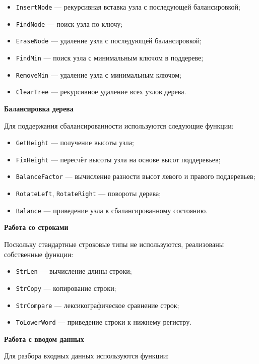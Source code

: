\documentclass[12pt]{article}
\begin{document}
\begin{itemize}
	\item \texttt{InsertNode} --- рекурсивная вставка узла с последующей балансировкой;
	\item \texttt{FindNode} --- поиск узла по ключу;
	\item \texttt{EraseNode} --- удаление узла с последующей балансировкой;
	\item \texttt{FindMin} --- поиск узла с минимальным ключом в поддереве;
	\item \texttt{RemoveMin} --- удаление узла с минимальным ключом;
	\item \texttt{ClearTree} --- рекурсивное удаление всех узлов дерева.
\end{itemize}

\textbf{Балансировка дерева}

Для поддержания сбалансированности используются следующие функции:

\begin{itemize}
	\item \texttt{GetHeight} --- получение высоты узла;
	\item \texttt{FixHeight} --- пересчёт высоты узла на основе высот поддеревьев;
	\item \texttt{BalanceFactor} --- вычисление разности высот левого и правого поддеревьев;
	\item \texttt{RotateLeft}, \texttt{RotateRight} --- повороты дерева;
	\item \texttt{Balance} --- приведение узла к сбалансированному состоянию.
\end{itemize}

\textbf{Работа со строками}

Поскольку стандартные строковые типы не используются, реализованы собственные функции:

\begin{itemize}
	\item \texttt{StrLen} --- вычисление длины строки;
	\item \texttt{StrCopy} --- копирование строки;
	\item \texttt{StrCompare} --- лексикографическое сравнение строк;
	\item \texttt{ToLowerWord} --- приведение строки к нижнему регистру.
\end{itemize}

\textbf{Работа с вводом данных}

Для разбора входных данных используются функции:
\end{document}
